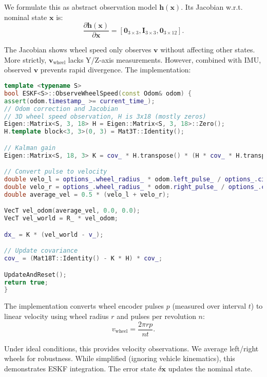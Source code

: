 We formulate this as abstract observation model $\bm{h}(\bm{x})$. Its Jacobian w.r.t. nominal state $\bm{x}$ is:
\begin{equation}\label{eq:wheel-jacobian}
\frac{\partial \bm{h} (\bm{x})}{\partial \bm{x}} = \left[\bm{0}_{3\times 3}, \bm{I}_{3 \times 3}, \bm{0}_{3\times 12} \right].
\end{equation}

The Jacobian shows wheel speed only observes $\bm{v}$ without affecting other states. More strictly, $\bm{v}_{\mathrm{wheel}}$ lacks Y/Z-axis measurements. However, combined with IMU, observed $\bm{v}$ prevents rapid divergence. The implementation:

\begin{lstlisting}[language=c++, caption=src/ch3/eskf.hpp]
template <typename S>
bool ESKF<S>::ObserveWheelSpeed(const Odom& odom) {
assert(odom.timestamp_ >= current_time_);
// Odom correction and Jacobian
// 3D wheel speed observation, H is 3x18 (mostly zeros)
Eigen::Matrix<S, 3, 18> H = Eigen::Matrix<S, 3, 18>::Zero();
H.template block<3, 3>(0, 3) = Mat3T::Identity();

// Kalman gain
Eigen::Matrix<S, 18, 3> K = cov_ * H.transpose() * (H * cov_ * H.transpose() + odom_noise_).inverse();

// Convert pulse to velocity
double velo_l = options_.wheel_radius_ * odom.left_pulse_ / options_.circle_pulse_ * 2 * M_PI / options_.odom_span_;
double velo_r = options_.wheel_radius_ * odom.right_pulse_ / options_.circle_pulse_ * 2 * M_PI / options_.odom_span_;
double average_vel = 0.5 * (velo_l + velo_r);

VecT vel_odom(average_vel, 0.0, 0.0);
VecT vel_world = R_ * vel_odom;

dx_ = K * (vel_world - v_);

// Update covariance
cov_ = (Mat18T::Identity() - K * H) * cov_;

UpdateAndReset();
return true;
}
\end{lstlisting}

The implementation converts wheel encoder pulses $p$ (measured over interval $t$) to linear velocity using wheel radius $r$ and pulses per revolution $n$:
\begin{equation}\label{eq:pulse-to-vel}
v_{\mathrm{wheel}} = \frac{2 \pi r p}{n t} .
\end{equation}

Under ideal conditions, this provides velocity observations. We average left/right wheels for robustness. While simplified (ignoring vehicle kinematics), this demonstrates ESKF integration. The error state $\delta \bm{x}$ updates the nominal state.

